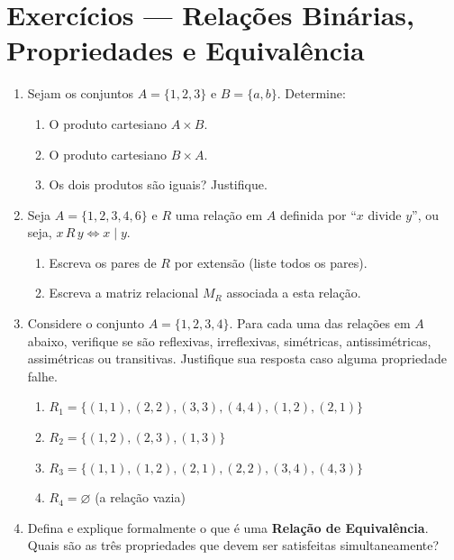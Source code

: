 \documentclass[12pt]{article}
\begin{document}
\vspace*{0.2cm}
\section*{Exercícios — Relações Binárias, Propriedades e Equivalência}

\begin{enumerate}

\item Sejam os conjuntos \(A = \{1, 2, 3\}\) e \(B = \{a, b\}\). Determine:
\begin{enumerate}[label=\alph*)]
    \item O produto cartesiano \(A \times B\).
    \item O produto cartesiano \(B \times A\).
    \item Os dois produtos são iguais? Justifique.
\end{enumerate}

\item Seja \(A = \{1, 2, 3, 4, 6\}\) e \(R\) uma relação em \(A\) definida por ``\(x\) divide \(y\)'', ou seja, \(x\,R\,y \Leftrightarrow x \mid y\).
\begin{enumerate}[label=\alph*)]
    \item Escreva os pares de \(R\) por extensão (liste todos os pares).
    \item Escreva a matriz relacional \(M_R\) associada a esta relação.
\end{enumerate}

\item Considere o conjunto \(A = \{1, 2, 3, 4\}\). Para cada uma das relações em \(A\) abaixo, verifique se são reflexivas, irreflexivas, simétricas, antissimétricas, assimétricas ou transitivas. Justifique sua resposta caso alguma propriedade falhe.
\begin{enumerate}[label=\alph*)]
    \item \(R_1 = \{(1,1), (2,2), (3,3), (4,4), (1,2), (2,1)\}\)
    \item \(R_2 = \{(1,2), (2,3), (1,3)\}\)
    \item \(R_3 = \{(1,1), (1,2), (2,1), (2,2), (3,4), (4,3)\}\)
    \item \(R_4 = \varnothing\) (a relação vazia)
\end{enumerate}

\item Defina e explique formalmente o que é uma \textbf{Relação de Equivalência}. Quais são as três propriedades que devem ser satisfeitas simultaneamente?


\end{enumerate}
\end{document}
